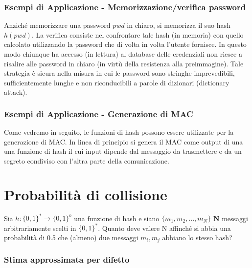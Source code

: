 \subsubsection{Esempi di Applicazione - Memorizzazione/verifica password}
Anziché memorizzare una password $pwd$ in chiaro, si memorizza il suo hash $h(pwd)$. La verifica consiste nel confrontare tale hash (in memoria) con quello calcolato utilizzando la password che di volta in volta l'utente fornisce. In questo modo chiunque ha accesso (in lettura) al database delle credenziali non riesce a risalire alle password in chiaro (in virtù della resistenza alla preimmagine). Tale strategia è sicura nella misura in cui le password sono stringhe imprevedibili, sufficientemente lunghe e non riconducibili a parole di dizionari (dictionary attack).

\subsubsection{Esempi di Applicazione - Generazione di MAC}
Come vedremo in seguito, le funzioni di hash possono essere utilizzate per la generazione di MAC. In linea di principio si genera il MAC come output di una una funzione di hash il cui input dipende dal messaggio da trasmettere e da un segreto condiviso con l'altra parte della comunicazione.

\section{Probabilità di collisione}
Sia $h:\{0, 1\}^{*} \rightarrow \{0, 1\}^{b}$ una funzione di hash e siano $\{m_{1}, m_{2}, ..., m_{N}\}$ \textbf{N} messaggi arbitrariamente scelti in $\{0, 1\}^{*}$. Quanto deve valere N affinché si abbia una probabilità di 0.5 che (almeno) due messaggi $m_{i}, m_{j}$ abbiano lo stesso hash?

\subsubsection{Stima approssimata per difetto} \label{par:stima_difetto}

